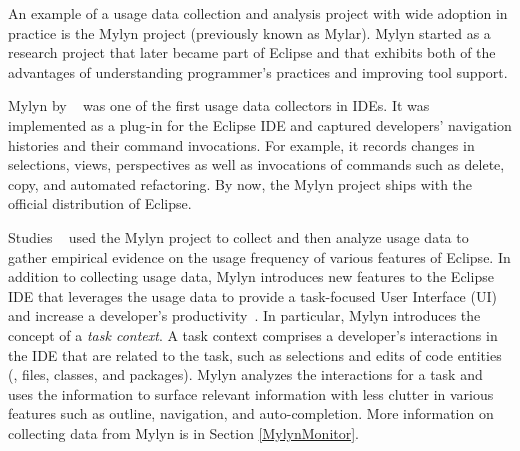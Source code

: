 
An example of a usage data collection and analysis project with wide adoption
in practice is the Mylyn project (previously known as Mylar). Mylyn started as a research project that later became part of Eclipse and that exhibits both of the advantages of understanding programmer's practices and improving tool support.

Mylyn by ~ was one of the first usage data collectors in IDEs. It was
implemented as a plug-in for the Eclipse IDE and captured developers' navigation
histories and their command invocations. For example, it records changes in
selections, views, perspectives as well as invocations of commands such as
delete, copy, and automated refactoring. By now, the Mylyn project ships with the official distribution of Eclipse.

Studies ~ used the Mylyn project to collect and then analyze usage data to gather empirical evidence on the usage frequency of various features of Eclipse.  In addition to collecting usage data, Mylyn introduces new features to the Eclipse
IDE that leverages the usage data to provide a task-focused User Interface (UI) and increase a developer's productivity~\cite{Kersten-Mylyn}. In particular, Mylyn introduces the concept of a \emph{task context}. A task context comprises a developer's interactions in the IDE that are related to the task, such as selections and edits of code entities (\eg, files, classes, and packages). Mylyn analyzes the interactions for a task and uses the information to surface relevant information with less clutter in various features such as outline, navigation, and auto-completion.  More information on collecting data from Mylyn is in Section \ref{MylynMonitor}.

%



